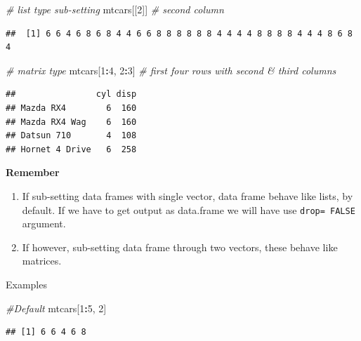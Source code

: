 \documentclass[
]{book}
\newenvironment{Shaded}{\begin{snugshade}}{\end{snugshade}}
\newcommand{\CommentTok}[1]{\textcolor[rgb]{0.56,0.35,0.01}{\textit{#1}}}
\newcommand{\DecValTok}[1]{\textcolor[rgb]{0.00,0.00,0.81}{#1}}
\newcommand{\NormalTok}[1]{#1}
\newcommand{\SpecialCharTok}[1]{\textcolor[rgb]{0.81,0.36,0.00}{\textbf{#1}}}
\providecommand{\tightlist}{%
  \setlength{\itemsep}{0pt}\setlength{\parskip}{0pt}}
\begin{document}
\begin{Shaded}
\begin{Highlighting}[]
\CommentTok{\# list type sub{-}setting}
\NormalTok{mtcars[[}\DecValTok{2}\NormalTok{]]  }\CommentTok{\# second column }
\end{Highlighting}
\end{Shaded}

\begin{verbatim}
##  [1] 6 6 4 6 8 6 8 4 4 6 6 8 8 8 8 8 8 4 4 4 4 8 8 8 8 4 4 4 8 6 8 4
\end{verbatim}

\begin{Shaded}
\begin{Highlighting}[]
\CommentTok{\# matrix type}
\NormalTok{mtcars[}\DecValTok{1}\SpecialCharTok{:}\DecValTok{4}\NormalTok{, }\DecValTok{2}\SpecialCharTok{:}\DecValTok{3}\NormalTok{] }\CommentTok{\# first four rows with second \& third columns}
\end{Highlighting}
\end{Shaded}

\begin{verbatim}
##                cyl disp
## Mazda RX4        6  160
## Mazda RX4 Wag    6  160
## Datsun 710       4  108
## Hornet 4 Drive   6  258
\end{verbatim}

\textbf{Remember}

\begin{enumerate}
\def\labelenumi{\arabic{enumi}.}
\tightlist
\item
  If sub-setting data frames with single vector, data frame behave like lists, by default. If we have to get output as data.frame we will have use \texttt{drop=\ FALSE} argument.
\item
  If however, sub-setting data frame through two vectors, these behave like matrices.
\end{enumerate}

Examples

\begin{Shaded}
\begin{Highlighting}[]
\CommentTok{\#Default}
\NormalTok{mtcars[}\DecValTok{1}\SpecialCharTok{:}\DecValTok{5}\NormalTok{, }\DecValTok{2}\NormalTok{]}
\end{Highlighting}
\end{Shaded}

\begin{verbatim}
## [1] 6 6 4 6 8
\end{verbatim}
\end{document}
